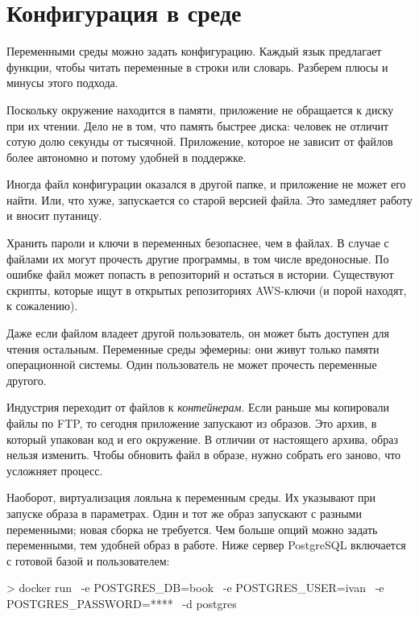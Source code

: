 \section{Конфигурация в среде}

Переменными среды можно задать конфигурацию. Каждый язык предлагает функции,
чтобы читать переменные в строки или словарь. Разберем плюсы и минусы этого
подхода.

Поскольку окружение находится в памяти, приложение не обращается к диску при их
чтении. Дело не в том, что память быстрее диска: человек не отличит сотую долю
секунды от тысячной. Приложение, которое не зависит от файлов более автономно и
потому удобней в поддержке.

Иногда файл конфигурации оказался в другой папке, и приложение не может его
найти. Или, что хуже, запускается со старой версией файла. Это замедляет работу
и вносит путаницу.

\label{password-note}

Хранить пароли и ключи в переменных безопаснее, чем в файлах. В случае с файлами
их могут прочесть другие программы, в том числе вредоносные. По ошибке файл
может попасть в репозиторий и остаться в истории. Существуют скрипты, которые
ищут в открытых репозиториях AWS-ключи (и порой находят, к сожалению).

Даже если файлом владеет другой пользователь, он может быть доступен для чтения
остальным. Переменные среды эфемерны: они живут только памяти операционной
системы. Один пользователь не может прочесть переменные другого.

Индустрия переходит от файлов к \emph{контейнерам}. Если раньше мы копировали
файлы по FTP, то сегодня приложение запускают из образов. Это архив, в который
упакован код и его окружение. В отличии от настоящего архива, образ нельзя
изменить. Чтобы обновить файл в образе, нужно собрать его заново, что усложняет
процесс.

Наоборот, виртуализация лояльна к переменным среды. Их указывают при запуске
образа в параметрах. Один и тот же образ запускают с разными переменными; новая
сборка не требуется. Чем больше опций можно задать переменными, тем удобней
образ в работе. Ниже сервер PostgreSQL включается с готовой базой и
пользователем:

\begin{english}
  \begin{bash}
> docker run \
  -e POSTGRES_DB=book \
  -e POSTGRES_USER=ivan \
  -e POSTGRES_PASSWORD=**** \
  -d postgres
  \end{bash}
\end{english}

